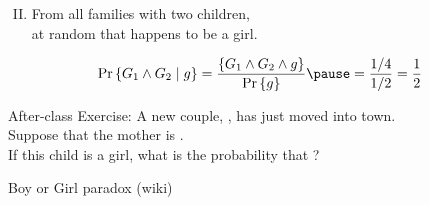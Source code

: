 \begin{frame}{}
  \centerline{}

  \vspace{0.60cm}
  \begin{enumerate}[(I)]
    \setcounter{enumi}{1}
    \item {} From all families with two children,  \\
      at random that happens to be a girl.
  \end{enumerate}

  \pause
  \vspace{0.50cm}
  \[
    \Pr\set{G_1 \land G_2 \mid g} = \frac{\set{G_1 \land G_2 \land g}}{\Pr\set{g}} \pause = \frac{1/4}{1/2} = \frac{1}{2}
  \]
\end{frame}

\begin{frame}{}
  \begin{exampleblock}{After-class Exercise:}
    A new couple, , has just moved into town. \\
    Suppose that the mother is . \\
    If this child is a girl, what is the probability that ?
  \end{exampleblock}

  \vspace{0.50cm}
\end{frame}

\begin{frame}{}

  \vspace{-0.30cm}
  \centerline{Boy or Girl paradox (wiki)}
\end{frame}
